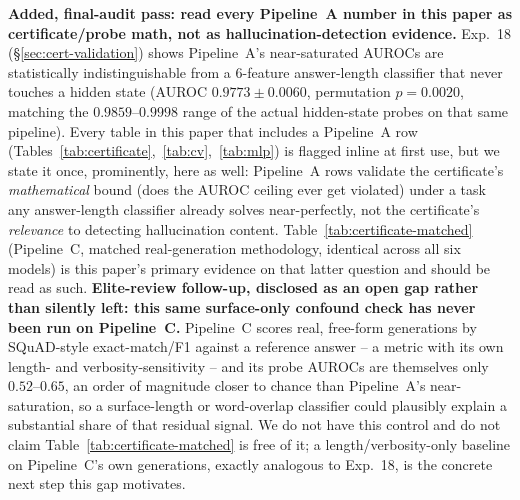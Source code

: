 \documentclass[10pt,twocolumn]{article}
\begin{document}
\textbf{Added, final-audit pass: read every Pipeline~A number in this
paper as certificate/probe math, not as hallucination-detection
evidence.} Exp.~18 (\S\ref{sec:cert-validation}) shows Pipeline~A's
near-saturated AUROCs are statistically indistinguishable from a
6-feature answer-length classifier that never touches a hidden state
(AUROC $0.9773\pm0.0060$, permutation $p=0.0020$, matching the
$0.9859$--$0.9998$ range of the actual hidden-state probes on that same
pipeline). Every table in this paper that includes a Pipeline~A row
(Tables~\ref{tab:certificate},~\ref{tab:cv},~\ref{tab:mlp}) is flagged
inline at first use, but we state it once, prominently, here as well:
Pipeline~A rows validate the certificate's \emph{mathematical} bound
(does the AUROC ceiling ever get violated) under a task any answer-length
classifier already solves near-perfectly, not the certificate's
\emph{relevance} to detecting hallucination content. Table~\ref{tab:certificate-matched}
(Pipeline~C, matched real-generation methodology, identical across all
six models) is this paper's primary evidence on that latter question and
should be read as such. \textbf{Elite-review follow-up, disclosed as an
open gap rather than silently left: this same surface-only confound
check has never been run on Pipeline~C.} Pipeline~C scores real,
free-form generations by SQuAD-style exact-match/F1 against a reference
answer -- a metric with its own length- and verbosity-sensitivity --
and its probe AUROCs are themselves only $0.52$--$0.65$, an order of
magnitude closer to chance than Pipeline~A's near-saturation, so a
surface-length or word-overlap classifier could plausibly explain a
substantial share of that residual signal. We do not have this control
and do not claim Table~\ref{tab:certificate-matched} is free of it; a
length/verbosity-only baseline on Pipeline~C's own generations, exactly
analogous to Exp.~18, is the concrete next step this gap motivates.
\end{document}
